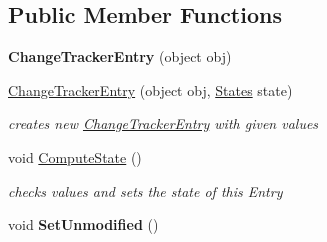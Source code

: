 \subsection*{Public Member Functions}
\begin{DoxyCompactItemize}
\item 
\mbox{\label{class_linq_1_1_change_tracker_entry_a41acb5b41eb5bf272b026d39fb245895}} 
{\bfseries Change\+Tracker\+Entry} (object obj)
\item 
\mbox{\hyperlink{class_linq_1_1_change_tracker_entry_a9276ab8cf07caaca4252287401d7e1c6}{Change\+Tracker\+Entry}} (object obj, \mbox{\hyperlink{class_linq_1_1_change_tracker_entry_aded3f97a3bd1326ae1b264c7618b7828}{States}} state)
\begin{DoxyCompactList}\small\item\em creates new \mbox{\hyperlink{class_linq_1_1_change_tracker_entry}{Change\+Tracker\+Entry}} with given values \end{DoxyCompactList}\item 
void \mbox{\hyperlink{class_linq_1_1_change_tracker_entry_a7de1eab4061b442ad072961ff18792aa}{Compute\+State}} ()
\begin{DoxyCompactList}\small\item\em checks values and sets the state of this Entry \end{DoxyCompactList}\item 
\mbox{\label{class_linq_1_1_change_tracker_entry_ab588fdc9b57a0471b33c2a3bcbac2938}} 
void {\bfseries Set\+Unmodified} ()
\end{DoxyCompactItemize}
